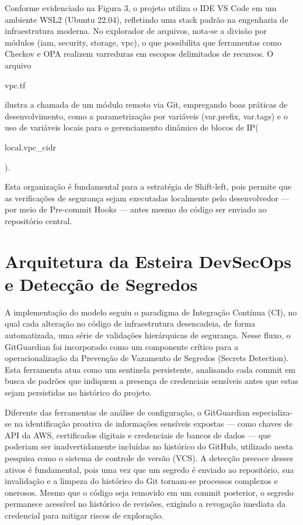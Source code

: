 Conforme evidenciado na Figura 3, o projeto utiliza o IDE VS Code em um ambiente WSL2 (Ubuntu 22.04), refletindo uma stack padrão na engenharia de infraestrutura moderna. No explorador de arquivos, nota-se a divisão por módulos (iam, security, storage, vpc), o que possibilita que ferramentas como Checkov e OPA realizem varreduras em escopos delimitados de recursos. O arquivo \begin{foo}vpc.tf\end{foo}
ilustra a chamada de um módulo remoto via Git, empregando boas práticas de desenvolvimento, como a parametrização por variáveis (var.prefix, var.tags) e o uso de variáveis locais para o gerenciamento dinâmico de blocos de IP(\begin{foo}local.vpc_cidr\end{foo}
).

Esta organização é fundamental para a estratégia de Shift-left, pois permite que as verificações de segurança sejam executadas localmente pelo desenvolvedor — por meio de Pre-commit Hooks — antes mesmo do código ser enviado ao repositório central.

\section{ Arquitetura da Esteira DevSecOps e Detecção de Segredos}
A implementação do modelo seguiu o paradigma de Integração Contínua (CI), no qual cada alteração no código de infraestrutura desencadeia, de forma automatizada, uma série de validações hierárquicas de segurança. Nesse fluxo, o GitGuardian foi incorporado como um componente crítico para a operacionalização da Prevenção de Vazamento de Segredos (Secrets Detection). Esta ferramenta atua como um sentinela persistente, analisando cada commit em busca de padrões que indiquem a presença de credenciais sensíveis antes que estas sejam persistidas no histórico do projeto.

Diferente das ferramentas de análise de configuração, o GitGuardian especializa-se na identificação proativa de informações sensíveis expostas — como chaves de API da AWS, certificados digitais e credenciais de bancos de dados — que poderiam ser inadvertidamente incluídas no histórico do GitHub, utilizado nesta pesquisa como o sistema de controle de versão (VCS). A detecção precoce desses ativos é fundamental, pois uma vez que um segredo é enviado ao repositório, sua invalidação e a limpeza do histórico do Git tornam-se processos complexos e onerosos. Mesmo que o código seja removido em um commit posterior, o segredo permanece acessível no histórico de revisões, exigindo a revogação imediata da credencial para mitigar riscos de exploração.

